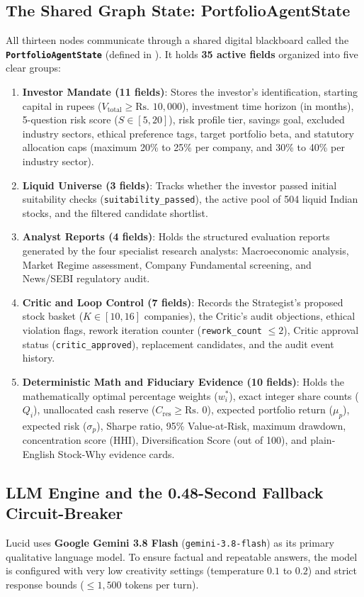 \subsection{The Shared Graph State: PortfolioAgentState}
All thirteen nodes communicate through a shared digital blackboard called the \textbf{\texttt{PortfolioAgentState}} (defined in ). It holds \textbf{35 active fields} organized into five clear groups:
\begin{enumerate}
    \item \textbf{Investor Mandate (11 fields)}: Stores the investor's identification, starting capital in rupees ($V_{\text{total}} \ge \text{Rs.~}10,000$), investment time horizon (in months), 5-question risk score ($S \in [5, 20]$), risk profile tier, savings goal, excluded industry sectors, ethical preference tags, target portfolio beta, and statutory allocation caps (maximum 20\% to 25\% per company, and 30\% to 40\% per industry sector).
    \item \textbf{Liquid Universe (3 fields)}: Tracks whether the investor passed initial suitability checks (\texttt{suitability\_passed}), the active pool of 504 liquid Indian stocks, and the filtered candidate shortlist.
    \item \textbf{Analyst Reports (4 fields)}: Holds the structured evaluation reports generated by the four specialist research analysts: Macroeconomic analysis, Market Regime assessment, Company Fundamental screening, and News/SEBI regulatory audit.
    \item \textbf{Critic and Loop Control (7 fields)}: Records the Strategist's proposed stock basket ($K \in [10, 16]$ companies), the Critic's audit objections, ethical violation flags, rework iteration counter (\texttt{rework\_count} $\le 2$), Critic approval status (\texttt{critic\_approved}), replacement candidates, and the audit event history.
    \item \textbf{Deterministic Math and Fiduciary Evidence (10 fields)}: Holds the mathematically optimal percentage weights ($w_i^*$), exact integer share counts ($Q_i$), unallocated cash reserve ($C_{\text{res}} \ge \text{Rs.~}0$), expected portfolio return ($\mu_p$), expected risk ($\sigma_p$), Sharpe ratio, 95\% Value-at-Risk, maximum drawdown, concentration score (HHI), Diversification Score (out of 100), and plain-English Stock-Why evidence cards.
\end{enumerate}

\subsection{LLM Engine and the 0.48-Second Fallback Circuit-Breaker}
Lucid uses \textbf{Google Gemini 3.8 Flash} (\texttt{gemini-3.8-flash}) as its primary qualitative language model. To ensure factual and repeatable answers, the model is configured with very low creativity settings (temperature $0.1$ to $0.2$) and strict response bounds ($\le 1,500$ tokens per turn).

